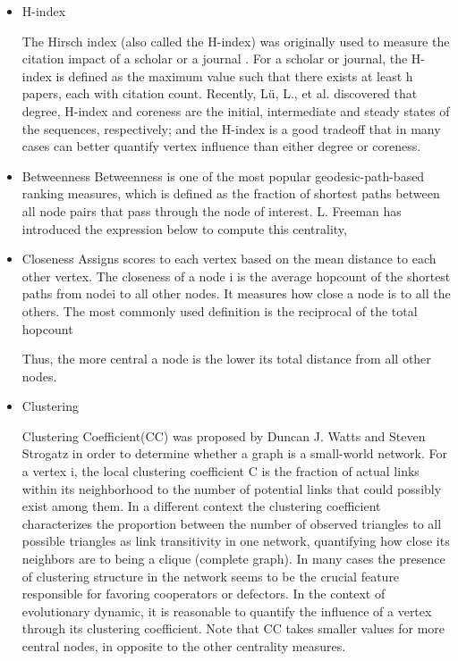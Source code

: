 \documentclass[preprint,12pt,3p]{elsarticle}
\begin{document}
\begin{itemize}
\item H-index

The Hirsch index (also called the H-index)\cite{Hirsch-18310} was originally used
to measure the citation impact of a scholar or a journal \cite{BraunGlänzel-18314}.
For a scholar or journal, the H-index is defined as the maximum value such
that there exists at least h papers, each with citation count.
Recently, Lü, L., et al.\cite{LüZhou-18192} discovered that degree, H-index and coreness are the initial, intermediate and steady states of the sequences, respectively;
and the H-index is a good tradeoff that in many cases can better quantify vertex influence than either degree or coreness.

\item Betweenness
Betweenness \cite{Anthonisse-18331} is one of the most popular geodesic-path-based ranking measures,
which is defined as the fraction of shortest paths between all node pairs that
pass through the node of interest.
L. Freeman \cite{Freeman-18315} has introduced the expression below to compute this centrality,

\item Closeness
Assigns scores to each vertex based on the mean distance to each other vertex.
The closeness \cite{KoschützkiLehmann-18332} of a node i is the average hopcount
of the shortest paths from nodei to all other nodes. It
measures how close a node is to all the others. The most
commonly used definition is the reciprocal of the total
hopcount

Thus, the more central a node is the lower its total distance from all other nodes.

\item Clustering

Clustering Coefficient(CC) was proposed by Duncan J. Watts and Steven Strogatz \cite{WattsStrogatz-18333} in order to determine whether a graph is a small-world network.
For a vertex i, the local clustering coefficient C is the fraction of actual links within its neighborhood to the number of potential links that could possibly exist among them.
In a different context the clustering coefficient characterizes the proportion between the number of observed triangles to all possible triangles as link transitivity in one network, quantifying how close its neighbors are to being a clique (complete graph).
In many cases the presence of clustering structure in the network seems to be the crucial feature responsible for favoring cooperators or defectors\cite{SantosPacheco-18280,Gracia-LázaroCuesta-18325,HuangZheng-18221}.
In the context of evolutionary dynamic, it is reasonable to quantify the influence of a vertex through its clustering coefficient.
Note that CC takes smaller values for more central nodes, in opposite to the other centrality measures.


\end{itemize}
\end{document}
